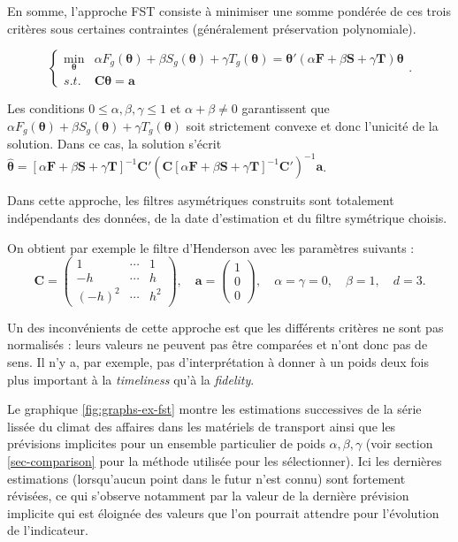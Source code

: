 \documentclass[
  12pt,
  a4paper,french]{article}
\newcommand\1{\mathds{1}}
\begin{document}
En somme, l'approche FST consiste à minimiser une somme pondérée de ces trois critères sous certaines contraintes (généralement préservation polynomiale).

\begin{equation}
\begin{cases}
\underset{\boldsymbol\theta}{\min} &
\alpha F_g(\boldsymbol \theta)+\beta S_g(\boldsymbol \theta)+\gamma T_g(\boldsymbol \theta) = 
\boldsymbol \theta'(\alpha\boldsymbol F+\beta \boldsymbol S+ \gamma \boldsymbol T)\boldsymbol \theta\\
s.t. & \boldsymbol C\boldsymbol \theta=\boldsymbol a
\end{cases}. \label{eq:gugemmos}
\end{equation}

Les conditions \(0\leq\alpha,\beta,\gamma\leq 1\) et \(\alpha+\beta\ne0\) garantissent que \(\alpha F_g(\boldsymbol \theta)+\beta S_g(\boldsymbol \theta)+\gamma T_g(\boldsymbol \theta)\) soit strictement convexe et donc l'unicité de la solution.
Dans ce cas, la solution s'écrit \(\hat {\boldsymbol \theta} = [\alpha \boldsymbol F+\beta \boldsymbol S+ \gamma \boldsymbol T]^{-1}\boldsymbol C'\left(\boldsymbol C[\alpha \boldsymbol F+\beta \boldsymbol S+ \gamma \boldsymbol T]^{-1}\boldsymbol C'\right)^{-1}\boldsymbol a\).

Dans cette approche, les filtres asymétriques construits sont totalement indépendants des données, de la date d'estimation et du filtre symétrique choisis.

On obtient par exemple le filtre d'Henderson avec les paramètres suivants :
\[\boldsymbol C=\begin{pmatrix}
1 & \cdots&1\\
-h & \cdots&h \\
(-h)^2 & \cdots&h^2
\end{pmatrix},\quad
\boldsymbol a=\begin{pmatrix}
1 \\0\\0
\end{pmatrix},\quad
\alpha=\gamma=0,\quad
\beta=1,\quad d=3.\]

Un des inconvénients de cette approche est que les différents critères ne sont pas normalisés : leurs valeurs ne peuvent pas être comparées et n'ont donc pas de sens.
Il n'y a, par exemple, pas d'interprétation à donner à un poids deux fois plus important à la \emph{timeliness} qu'à la \emph{fidelity}.

Le graphique \ref{fig:graphs-ex-fst} montre les estimations successives de la série lissée du climat des affaires dans les matériels de transport ainsi que les prévisions implicites pour un ensemble particulier de poids \(\alpha,\beta,\gamma\) (voir section \ref{sec-comparison} pour la méthode utilisée pour les sélectionner).
Ici les dernières estimations (lorsqu'aucun point dans le futur n'est connu) sont fortement révisées, ce qui s'observe notamment par la valeur de la dernière prévision implicite qui est éloignée des valeurs que l'on pourrait attendre pour l'évolution de l'indicateur.
\end{document}
